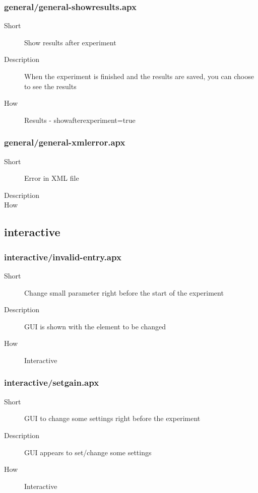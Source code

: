 \subsubsection{general/general-showresults.apx}
\begin{description}
\item[Short] 
 Show results after experiment
\item[Description] 
 When the experiment is finished and the results are saved, you can choose to see the results
\item[How] 
 Results - showafterexperiment=true
\end{description}

\subsubsection{general/general-xmlerror.apx}
\begin{description}
\item[Short] 
 Error in XML file
\item[Description] 

\item[How] 

\end{description}

\subsection{interactive}
\subsubsection{interactive/invalid-entry.apx}
\begin{description}
\item[Short] 
 Change small parameter right before the start of the experiment
\item[Description] 
 GUI is shown with the element to be changed
\item[How] 
 Interactive
\end{description}

\subsubsection{interactive/setgain.apx}
\begin{description}
\item[Short] 
 GUI to change some settings right before the experiment
\item[Description] 
 GUI appears to set/change some settings
\item[How] 
 Interactive
\end{description}

